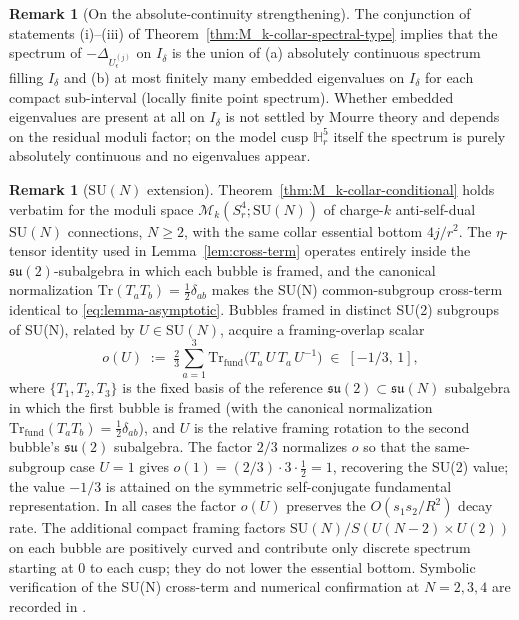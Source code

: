 \documentclass[11pt,letterpaper]{article}
\theoremstyle{definition}
\newtheorem{remark}[theorem]{Remark}
\newcommand{\bbH}{\mathbb{H}}
\newcommand{\cM}{\mathcal{M}}
\newcommand{\Lap}{\Delta}
\begin{document}
\begin{remark}[On the absolute-continuity strengthening]\label{rmk:AC}
The conjunction of statements (i)--(iii) of Theorem~\ref{thm:M_k-collar-spectral-type} implies that the spectrum of $-\Lap_{U_\epsilon^{(j)}}$ on $I_\delta$ is the union of (a) absolutely continuous spectrum filling $I_\delta$ and (b) at most finitely many embedded eigenvalues on $I_\delta$ for each compact sub-interval (locally finite point spectrum). Whether embedded eigenvalues are present at all on $I_\delta$ is not settled by Mourre theory and depends on the residual moduli factor; on the model cusp $\bbH^5_r$ itself the spectrum is purely absolutely continuous and no eigenvalues appear.
\end{remark}

\begin{remark}[$\mathrm{SU}(N)$ extension]\label{rmk:SUN}
Theorem~\ref{thm:M_k-collar-conditional} holds verbatim for the moduli space $\cM_k(S^4_r; \mathrm{SU}(N))$ of charge-$k$ anti-self-dual $\mathrm{SU}(N)$ connections, $N \ge 2$, with the same collar essential bottom $4j/r^2$. The $\eta$-tensor identity used in Lemma~\ref{lem:cross-term} operates entirely inside the $\mathfrak{su}(2)$-subalgebra in which each bubble is framed, and the canonical normalization $\mathrm{Tr}(T_a T_b) = \tfrac12\delta_{ab}$ makes the SU(N) common-subgroup cross-term identical to \eqref{eq:lemma-asymptotic}. Bubbles framed in distinct SU(2) subgroups of SU(N), related by $U \in \mathrm{SU}(N)$, acquire a framing-overlap scalar
\[
o(U) \;:=\; \tfrac{2}{3}\sum_{a=1}^{3} \mathrm{Tr}_{\mathrm{fund}}\bigl(T_a\,U\,T_a\,U^{-1}\bigr) \;\in\; [-1/3,\,1],
\]
where $\{T_1, T_2, T_3\}$ is the fixed basis of the reference $\mathfrak{su}(2) \subset \mathfrak{su}(N)$ subalgebra in which the first bubble is framed (with the canonical normalization $\mathrm{Tr}_{\mathrm{fund}}(T_a T_b) = \tfrac12\delta_{ab}$), and $U$ is the relative framing rotation to the second bubble's $\mathfrak{su}(2)$ subalgebra. The factor $2/3$ normalizes $o$ so that the same-subgroup case $U = 1$ gives $o(1) = (2/3)\cdot 3 \cdot \tfrac12 = 1$, recovering the SU(2) value; the value $-1/3$ is attained on the symmetric self-conjugate fundamental representation. In all cases the factor $o(U)$ preserves the $O(s_1 s_2/R^2)$ decay rate. The additional compact framing factors $\mathrm{SU}(N)/S(U(N{-}2)\times U(2))$ on each bubble are positively curved and contribute only discrete spectrum starting at $0$ to each cusp; they do not lower the essential bottom. Symbolic verification of the SU(N) cross-term and numerical confirmation at $N=2,3,4$ are recorded in \cite{lemma-ct-SUN}.
\end{remark}
\end{document}
